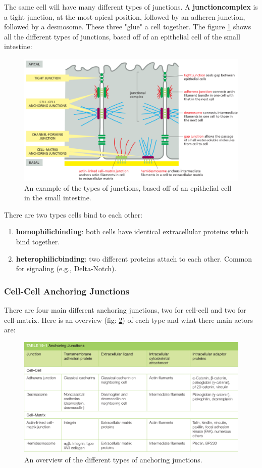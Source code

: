 \documentclass[../main.tex]{subfiles}
\begin{document}
The same cell will have many different types of junctions. A \textbf{\gls{junctioncomplex}} is a tight junction, at the most apical position, followed by an adheren junction, followed by a desmosome. These three "glue" a cell together. The figure \ref{fig:junctoverex} shows all the different types of junctions, based off of an epithelial cell of the small intestine: 

\begin{figure}[H]
	\centering
	\includegraphics[width=0.7\linewidth]{junct_overex}
	\caption{An example of the types of junctions, based off of an epithelial cell in the small intestine.}
	\label{fig:junctoverex}
\end{figure}


There are two types cells bind to each other:
\begin{enumerate}
	\item \textbf{\textbf{\gls{homophilicbinding}}}: both cells have identical extracellular proteins which bind together.
	\item \textbf{\textbf{\gls{heterophilicbinding}}}: two different proteins attach to each other. Common for signaling (e.g., Delta-Notch).
\end{enumerate}

\subsubsection{Cell-Cell Anchoring Junctions}

There are four main different anchoring junctions, two for cell-cell and two for cell-matrix. Here is an overview (fig: \ref{fig:anchover}) of each type and what there main actors are:

\begin{figure}[H]
	\centering
	\includegraphics[width=0.7\linewidth]{anch_over}
	\caption{An overview of the different types of anchoring junctions.}
	\label{fig:anchover}
\end{figure}
\end{document}
